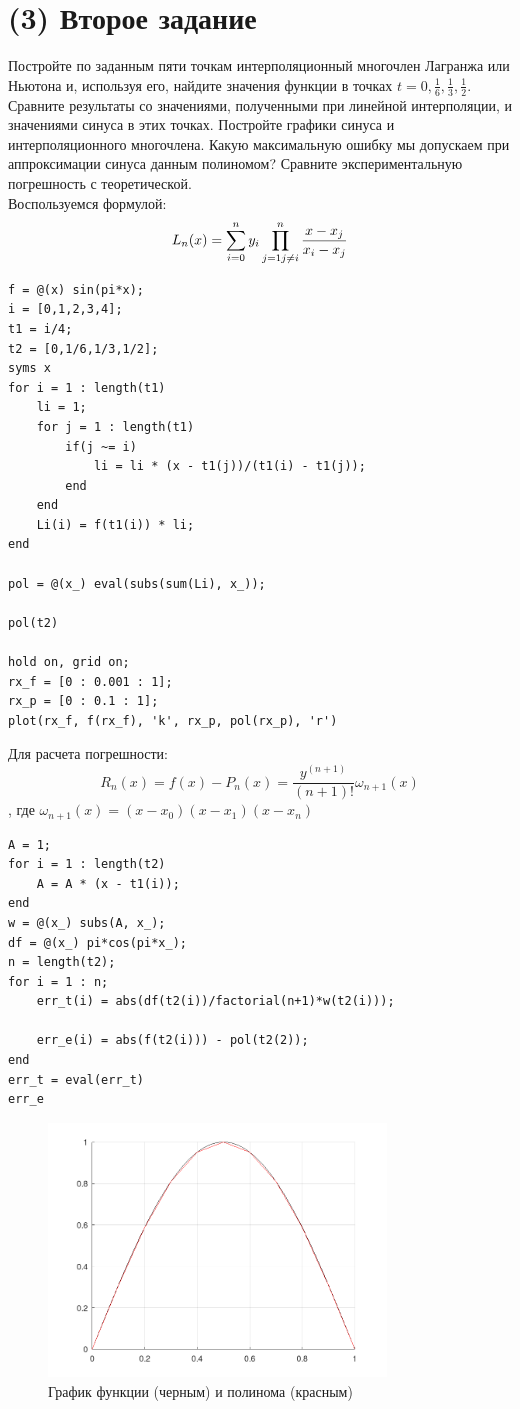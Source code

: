 \section{(3) Второе задание}
Постройте по заданным пяти точкам интерполяционный многочлен Лагранжа или Ньютона и, используя его, найдите значения функции в точках $t =0, \frac{1}{6}, \frac{1}{3}, \frac{1}{2}$. Сравните результаты со значениями, полученными при линейной интерполяции, и значениями синуса в этих точках. Постройте графики синуса и интерполяционного многочлена. Какую максимальную ошибку мы допускаем при аппроксимации синуса данным полиномом? Сравните экспериментальную погрешность с теоретической.\\[2mm]

Воспользуемся формулой:
\[
  L_{n}(x) = \sum_{i=0}^{n}y_{i}\prod_{j=1\\j \neq i}^{n}\frac{x-x_{j}}{x_{i}-x_{j}}
\]
\begin{lstlisting}
f = @(x) sin(pi*x);
i = [0,1,2,3,4];
t1 = i/4;
t2 = [0,1/6,1/3,1/2];
syms x
for i = 1 : length(t1)
	li = 1;
	for j = 1 : length(t1)
		if(j ~= i)
			li = li * (x - t1(j))/(t1(i) - t1(j));
		end
	end
	Li(i) = f(t1(i)) * li;
end

pol = @(x_) eval(subs(sum(Li), x_));

pol(t2)

hold on, grid on;
rx_f = [0 : 0.001 : 1];
rx_p = [0 : 0.1 : 1];
plot(rx_f, f(rx_f), 'k', rx_p, pol(rx_p), 'r')
\end{lstlisting}

Для расчета погрешности:
\[
  R_{n}(x) = f(x)-P_{n}(x) = \frac{y^{(n+1)}}{(n+1)!}\omega_{n+1}(x)
\]
, где $\omega_{n+1}(x) = (x-x_{0})(x-x_{1})(x-x_{n})$
\begin{lstlisting}
A = 1;
for i = 1 : length(t2)
	A = A * (x - t1(i));
end
w = @(x_) subs(A, x_);
df = @(x_) pi*cos(pi*x_);
n = length(t2);
for i = 1 : n;
	err_t(i) = abs(df(t2(i))/factorial(n+1)*w(t2(i)));

	err_e(i) = abs(f(t2(i))) - pol(t2(2));
end
err_t = eval(err_t)
err_e
\end{lstlisting}
\begin{figure}[H]
  \caption{График функции (черным) и полинома (красным)}
  \label{fig:plot_2}
  \centering
  \includegraphics[width=0.8\textwidth]{images/second_task_2.png}
\end{figure}

